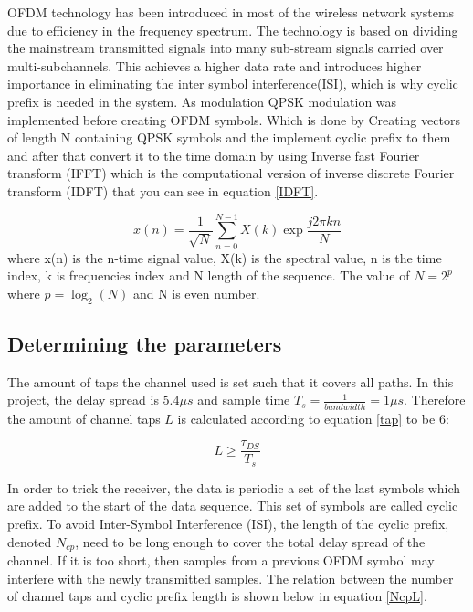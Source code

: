\documentclass[conference]{IEEEtran}
\begin{document}
 OFDM technology has been introduced in most of the wireless network systems due to efficiency in the frequency spectrum. The technology is based on dividing the mainstream transmitted signals into many sub-stream signals carried over multi-subchannels. This achieves a higher data rate and introduces higher importance in eliminating the inter symbol interference(ISI), which is why cyclic prefix is needed in the system. As modulation QPSK modulation was implemented before creating OFDM symbols. Which is done by Creating vectors of length N containing QPSK symbols and the implement cyclic prefix to them and after that convert it to the time domain by using Inverse fast Fourier transform (IFFT) which is the computational version of inverse discrete Fourier transform (IDFT) that you can see in equation \ref{IDFT}.


\begin{equation}
x(n)= \frac{1}{\sqrt{N}}\sum_{n=0}^{N-1} X(k) \exp{\frac{j2\pi kn}{N}}  \label{IDFT}
\end{equation}
where x(n) is the n-time signal value, X(k) is the spectral value, n is the time index, k is frequencies index and N length of the sequence.
The value of $N= 2^p$ where $p = \log_{2}(N)$ and N is even number.



\subsection{Determining the parameters}

The amount of taps the channel used is set such that it covers all paths. In this project, the delay spread is $5.4 \mu s$ and sample time $T_s = \frac{1}{bandwidth} = 1 \mu s$. Therefore the amount of channel taps $L$ is calculated according to equation \ref{tap} to be 6: 

\begin{equation}
    L \geq \frac{\tau_{DS}}{T_s}
    \label{tap}
\end{equation}

In order to trick the receiver, the data is periodic a set of the last symbols which are added to the start of the data sequence. This set of symbols are called cyclic prefix. To avoid Inter-Symbol Interference (ISI), the length of the cyclic prefix, denoted $N_{cp}$, need to be long enough to cover the total delay spread of the channel. If it is too short, then samples from a previous OFDM symbol may interfere with the newly transmitted samples. The relation between the number of channel taps and cyclic prefix length is shown below in equation \ref{NcpL}.
\end{document}
